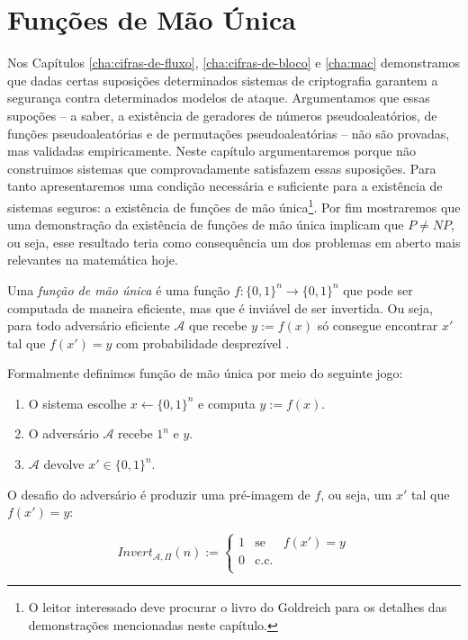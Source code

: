 \chapter{Funções de Mão Única}
\label{cha:owf}

Nos Capítulos \ref{cha:cifras-de-fluxo}, \ref{cha:cifras-de-bloco} e \ref{cha:mac} demonstramos que dadas certas suposições determinados sistemas de criptografia garantem a segurança contra determinados modelos de ataque.
Argumentamos que essas supoções -- a saber, a existência de geradores de números pseudoaleatórios, de funções pseudoaleatórias e de permutações pseudoaleatórias -- não são provadas, mas validadas empiricamente.
Neste capítulo argumentaremos porque não construimos sistemas que comprovadamente satisfazem essas suposições.
Para tanto apresentaremos uma condição necessária e suficiente para a existência de sistemas seguros: a existência de funções de mão única\footnote{O leitor interessado deve procurar o livro do Goldreich \cite{Goldreich07} para os detalhes das demonstrações mencionadas neste capítulo.}.
Por fim mostraremos que uma demonstração da existência de funções de mão única implicam que $P \neq NP$, ou seja, esse resultado teria como consequência um dos problemas em aberto mais relevantes na matemática hoje.

Uma {\em função de mão única} é uma função $f: \{0,1\}^n \to \{0,1\}^n$ que pode ser computada de maneira eficiente, mas que é inviável de ser invertida.
Ou seja, para todo adversário eficiente $\mathcal{A}$ que recebe $y := f(x)$ só consegue encontrar $x'$ tal que $f(x') = y$ com probabilidade desprezível \cite{Diffie76,Yao82}.

Formalmente definimos função de mão única por meio do seguinte jogo:
\begin{enumerate}
\item O sistema escolhe $x \leftarrow \{0,1\}^n$ e computa $y := f(x)$.
\item O adversário $\mathcal{A}$ recebe $1^n$ e $y$.
\item $\mathcal{A}$ devolve $x' \in \{0,1\}^n$.
\end{enumerate}

O desafio do adversário é produzir uma pré-imagem de $f$, ou seja, um $x'$ tal que $f(x') = y$:

\begin{displaymath}
  Invert_{\mathcal{A}, \Pi}(n) := \left\{
    \begin{array}{lcl}
      1 & \textrm{se} & f(x') = y\\
      0 & \textrm{c.c.} &\\
    \end{array}
    \right.
\end{displaymath}

